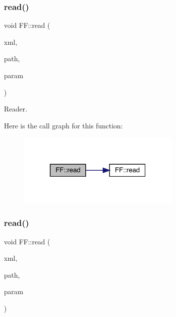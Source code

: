 \subsubsection{\texorpdfstring{read()}{read()}\hspace{0.1cm}{\footnotesize\ttfamily [4/14]}}
{\footnotesize\ttfamily void F\+F\+::read (\begin{DoxyParamCaption}\item[{X\+M\+L\+Reader \&}]{xml,  }\item[{const std\+::string \&}]{path,  }\item[{\mbox{\hyperlink{structFF_1_1PiPf}{Pi\+Pf}} \&}]{param }\end{DoxyParamCaption})}



Reader. 

Here is the call graph for this function\+:\nopagebreak
\begin{figure}[H]
\begin{center}
\leavevmode
\includegraphics[width=224pt]{d5/da6/namespaceFF_ab0ac23f91d1403059f1df825a7ab775f_cgraph}
\end{center}
\end{figure}
\mbox{\label{namespaceFF_a457d1bd921b678eadc34fb2dbfcbdb32}} 
\subsubsection{\texorpdfstring{read()}{read()}\hspace{0.1cm}{\footnotesize\ttfamily [5/14]}}
{\footnotesize\ttfamily void F\+F\+::read (\begin{DoxyParamCaption}\item[{X\+M\+L\+Reader \&}]{xml,  }\item[{const std\+::string \&}]{path,  }\item[{\mbox{\hyperlink{structFF_1_1KeyHadron3PtCorr__t}{Key\+Hadron3\+Pt\+Corr\+\_\+t}} \&}]{param }\end{DoxyParamCaption})}



